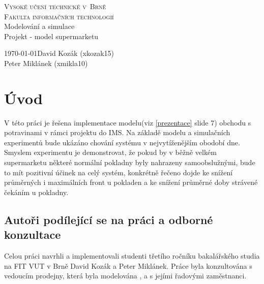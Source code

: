 \documentclass[12pt,a4paper,titlepage]{article}
\begin{document}
\begin{titlepage}
\begin{center}
    {
    	\Huge\textsc{Vysoké učení technické v~Brně}}\\
    \smallskip
    {
    	\huge\textsc{Fakulta informačních technologií}}\\
    \bigskip
    \huge{Modelování a simulace}\\
    \smallskip
    \Huge{Projekt - model supermarketu}\\
\end{center}
    {\Large \today \hfill David Kozák (xkozak15)  }\\
    \smallskip
    {\Large \hfill Peter Miklánek (xmikla10)}
\end{titlepage}

\newpage
\tableofcontents
\newpage

\section{Úvod}
V této práci je řešena implementace modelu(viz \ref{prezentace} slide 7) obchodu s potravinami v rámci projektu do IMS.
Na základě modelu a simulačních experimentů bude ukázáno chování systému v nejvytíženějším obodobí dne. Smyslem experimentu je demonstrovat, že pokud by v běžně velkém supermarketu některé normální pokladny byly nahrazeny samoobslužnými, bude to mít pozitivní účinek na celý systém, konkrétně řečeno dojde ke snížení průměrných i maximálních front u pokladen a ke snížení průměrné doby strávené čekáním u pokladny.
\subsection{Autoři podílející se na práci a odborné konzultace}
Celou práci navrhli a implementovali studenti třetího ročníku bakalářského studia na FIT VUT v Brně David Kozák a Peter Miklánek. Práce byla konzultována s vedoucím prodejny, která byla modelována , a s jejími řadovými zaměstnanci. 
\end{document}
